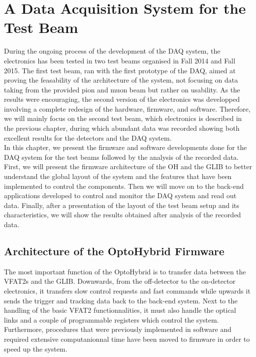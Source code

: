 \chapter{A Data Acquisition System for the Test Beam}
\label{chap:II-3-test-beam}

  During the ongoing process of the development of the DAQ system, the electronics has been tested in two test beams organised in Fall 2014 and Fall 2015. The first test beam, ran with the first prototype of the DAQ, aimed at proving the feasability of the architecture of the system, not focusing on data taking from the provided pion and muon beam but rather on usability. As the results were encouraging, the second version of the electronics was developped involving a complete redesign of the hardware, firmware, and software. Therefore, we will mainly focus on the second test beam, which electronics is described in the previous chapter, during which abundant data was recorded showing both excellent results for the detectors and the DAQ system. \\

  In this chapter, we present the firmware and software developments done for the DAQ system for the test beams followed by the analysis of the recorded data. First, we will present the firmware architecture of the OH and the GLIB to better understand the global layout of the system and the features that have been implemented to control the components. Then we will move on to the back-end applications developed to control and monitor the DAQ system and read out data. Finally, after a presentation of the layout of the test beam setup and its characteristics, we will show the results obtained after analysis of the recorded data.

  \section{Architecture of the OptoHybrid Firmware}

    The most important function of the OptoHybrid is to transfer data between the VFAT2s and the GLIB. Downwards, from the off-detector to the on-detector electronics, it transfers slow control requests and fast commands while upwards it sends the trigger and tracking data back to the back-end system. Next to the handling of the basic VFAT2 functionnalities, it must also handle the optical links and a couple of programmable registers which control the system. Furthermore, procedures that were previously implemented in software and required extensive computanionnal time have been moved to firmware in order to speed up the system. \\

